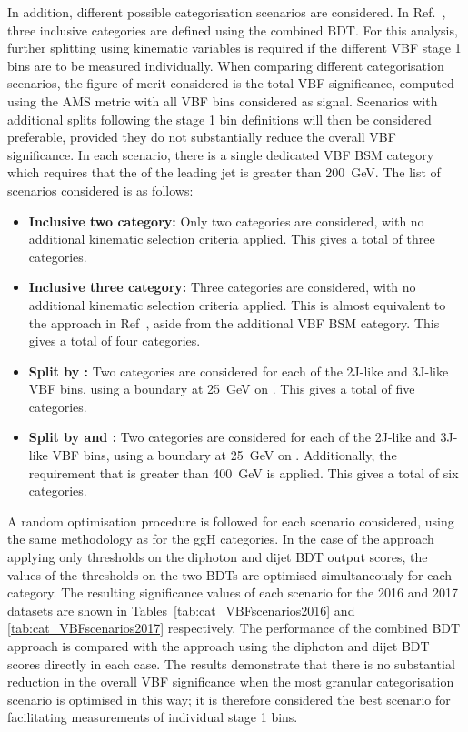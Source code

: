 In addition, different possible categorisation scenarios are considered.
In Ref.~\cite{HIG-16-040}, three inclusive categories are defined using the combined BDT.
For this analysis, further splitting using kinematic variables is required 
if the different VBF stage 1 bins are to be measured individually.
When comparing different categorisation scenarios,
the figure of merit considered is the total VBF significance, 
computed using the AMS metric with all VBF bins considered as signal.
Scenarios with additional splits following the stage 1 bin definitions 
will then be considered preferable, 
provided they do not substantially reduce the overall VBF significance.
In each scenario, there is a single dedicated VBF BSM category 
which requires that the \pt of the leading jet is greater than \SI{200}{GeV}.
The list of scenarios considered is as follows:
\begin{itemize}
\item \textbf{Inclusive two category:} Only two categories are considered, 
      with no additional kinematic selection criteria applied.
      This gives a total of three categories.
\item \textbf{Inclusive three category:} Three categories are considered, 
      with no additional kinematic selection criteria applied.
      This is almost equivalent to the approach in Ref~\cite{HIG-16-040}, 
      aside from the additional VBF BSM category.
      This gives a total of four categories.
\item \textbf{Split by \ptHjj:} Two categories are considered 
      for each of the 2J-like and 3J-like VBF bins,
      using a boundary at \SI{25}{GeV} on \ptHjj.
      This gives a total of five categories.
\item \textbf{Split by \ptHjj and \mjj:} Two categories are considered
      for each of the 2J-like and 3J-like VBF bins,
      using a boundary at \SI{25}{GeV} on \ptHjj.
      Additionally, the requirement that \mjj is greater than \SI{400}{GeV} is applied.
      This gives a total of six categories.
\end{itemize}

A random optimisation procedure is followed for each scenario considered, 
using the same methodology as for the ggH categories.
In the case of the approach applying only thresholds on the diphoton and dijet BDT output scores, 
the values of the thresholds on the two BDTs are optimised simultaneously for each category.
The resulting significance values of each scenario for the 2016 and 2017 datasets 
are shown in Tables~\ref{tab:cat_VBFscenarios2016} and \ref{tab:cat_VBFscenarios2017} respectively.
The performance of the combined BDT approach is compared with the approach using the diphoton 
and dijet BDT scores directly in each case.
The results demonstrate that there is no substantial reduction in the overall VBF significance
when the most granular categorisation scenario is optimised in this way;
it is therefore considered the best scenario for facilitating measurements of individual stage 1 bins.

